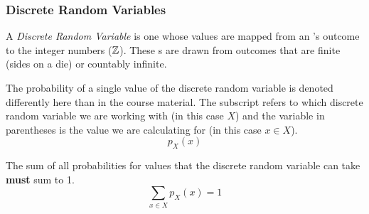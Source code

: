\subsubsection{Discrete Random Variables}\label{subsubsec:Discrete_Random_Variables}
\begin{definition}\label{def:Discrete_Random_Variable}
  A \emph{Discrete Random Variable} is one whose values are mapped from an 's outcome to the integer numbers ($\operatorname{\mathbb{Z}}$).
  These s are drawn from outcomes that are finite (sides on a die) or countably infinite.

  The probability of a single value of the discrete random variable is denoted differently here than in the course material.
  The subscript refers to which discrete random variable we are working with (in this case $X$) and the variable in parentheses is the value we are calculating for (in this case $x \in X$).
  \begin{equation}\label{eq:Discrete_Random_Variable-Single_Value}
    p_{X}(x)
  \end{equation}

  The sum of all probabilities for values that the discrete random variable can take \textbf{must} sum to 1.
  \begin{equation}\label{eq:Discrete_Random_Variable-Sum_to_One}
    \sum\limits_{x \in X} p_{X}(x) = 1
  \end{equation}

\end{definition}

